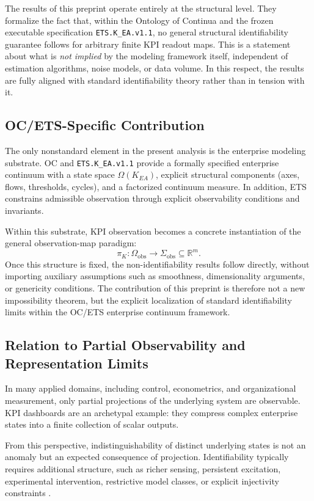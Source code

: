 The results of this preprint operate entirely at the structural level.
They formalize the fact that, within the Ontology of Continua and the frozen
executable specification \texttt{ETS.K\_EA.v1.1}, no general structural
identifiability guarantee follows for arbitrary finite KPI readout maps.
This is a statement about what is \emph{not implied} by the modeling framework
itself, independent of estimation algorithms, noise models, or data volume.
In this respect, the results are fully aligned with standard identifiability
theory rather than in tension with it.

\subsection{OC/ETS-Specific Contribution}

The only nonstandard element in the present analysis is the enterprise modeling
substrate.
OC and \texttt{ETS.K\_EA.v1.1} provide a formally specified enterprise continuum
with a state space \(\Omega(K_{EA})\), explicit structural components (axes,
flows, thresholds, cycles), and a factorized continuum measure.
In addition, ETS constrains admissible observation through explicit
observability conditions and invariants.

Within this substrate, KPI observation becomes a concrete instantiation of the
general observation-map paradigm:
\[
\pi_K:\Omega_{\mathrm{obs}}\to\Sigma_{\mathrm{obs}}\subseteq\mathbb{R}^m.
\]
Once this structure is fixed, the non-identifiability results follow directly,
without importing auxiliary assumptions such as smoothness, dimensionality
arguments, or genericity conditions.
The contribution of this preprint is therefore not a new impossibility theorem,
but the explicit localization of standard identifiability limits within the
OC/ETS enterprise continuum framework.

\subsection{Relation to Partial Observability and Representation Limits}

In many applied domains, including control, econometrics, and organizational
measurement, only partial projections of the underlying system are observable.
KPI dashboards are an archetypal example: they compress complex enterprise states
into a finite collection of scalar outputs.

From this perspective, indistinguishability of distinct underlying states is not
an anomaly but an expected consequence of projection.
Identifiability typically requires additional structure, such as richer sensing,
persistent excitation, experimental intervention, restrictive model classes,
or explicit injectivity constraints
\cite{slotine1991,walter1982}.

